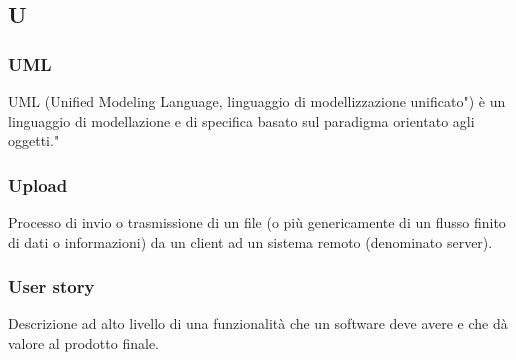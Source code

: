 \subsection*{\textbf{\hfill \Huge{U} \hfill}} 
\subsubsection*{UML}
UML (Unified Modeling Language, linguaggio di modellizzazione unificato") è un linguaggio di modellazione e di specifica basato sul paradigma orientato agli oggetti."
\subsubsection*{Upload}
Processo di invio o trasmissione di un file (o più genericamente di un flusso finito di dati o informazioni) da un client ad un sistema remoto (denominato server).
\subsubsection*{User story}
Descrizione ad alto livello di una funzionalità che un software deve avere e che dà valore al prodotto finale.
